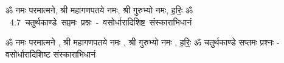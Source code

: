 \documentclass[17pt]{extarticle}
\begin{document}
\begin{titlepage}
    \begin{center}
 
\begin{sanskrit}
    { \Large
    ॐ नमः परमात्मने, श्री महागणपतये नमः, 
श्री गुरुभ्यो नमः, ह॒रिः॒ ॐ 
    }
    \\
    \vspace{2.5cm}
    \mbox{ \Huge
    4.7     चतुर्थकाण्डे सप्तमः प्रश्नः - वसोर्धारादिशिष्ट संस्काराभिधानं   }
\end{sanskrit}
\end{center}

\end{titlepage}
\tableofcontents

ॐ नमः परमात्मने , श्री महागणपतये नमः , श्री गुरुभ्यो नमः , ह॒रिः॒ ॐ      चतुर्थकाण्डे सप्तमः प्रश्नः - वसोर्धारादिशिष्ट संस्काराभिधानं \newline

\end{document}
